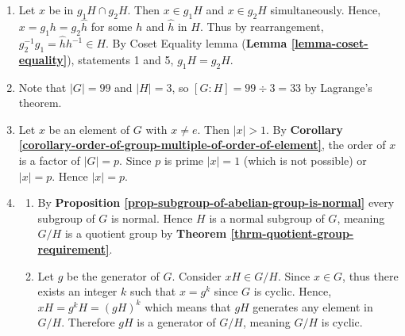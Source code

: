 \begin{enumerate}
    \item Let $x$ be in $g_1H \cap g_2H$. Then $x \in g_1H$ and $x \in g_2H$ simultaneously. Hence, $x = g_1h = g_2\hat{h}$ for some $h$ and $\hat{h}$ in $H$. Thus by rearrangement, $g_2^{-1}g_1 = \hat{h}h^{-1} \in H$. By Coset Equality lemma (\textbf{Lemma \ref{lemma-coset-equality}}), statements 1 and 5, $g_1H = g_2H$.

    \item Note that $|G| = 99$ and $|H| = 3$, so $[G:H] = 99 \div 3 = 33$ by Lagrange's theorem.

    \item Let $x$ be an element of $G$ with $x \neq e$. Then $|x| > 1$. By \textbf{Corollary \ref{corollary-order-of-group-multiple-of-order-of-element}}, the order of $x$ is a factor of $|G| = p$. Since $p$ is prime $|x| = 1$ (which is not possible) or $|x| = p$. Hence $|x| = p$.
    
    \item \begin{enumerate}[label=(\roman*)]
        \item By \textbf{Proposition \ref{prop-subgroup-of-abelian-group-is-normal}} every subgroup of $G$ is normal. Hence $H$ is a normal subgroup of $G$, meaning $G/H$ is a quotient group by \textbf{Theorem \ref{thrm-quotient-group-requirement}}.
        \item Let $g$ be the generator of $G$. Consider $xH \in G/H$. Since $x \in G$, thus there exists an integer $k$ such that $x = g^k$ since $G$ is cyclic. Hence, $xH = g^kH = (gH)^k$ which means that $gH$ generates any element in $G/H$. Therefore $gH$ is a generator of $G/H$, meaning $G/H$ is cyclic.
    \end{enumerate}
\end{enumerate}

